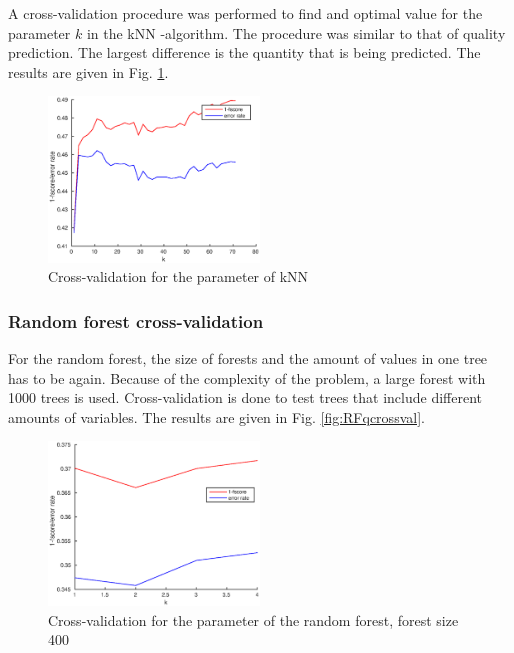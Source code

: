 \documentclass[twoside]{article}
\begin{document}
\begin{multicols}{2}
A cross-validation procedure was performed to find and optimal value for the parameter $k$ in the 
kNN -algorithm. The procedure was similar to that of quality prediction. The largest difference is
the quantity that is being predicted. The results are given in
Fig. \ref{fig:knnqcrossval}.

\begin{figure}[H]
\centering
\includegraphics[width=0.5\textwidth]{knnqcrossval}
\caption{Cross-validation for the parameter of kNN}
\label{fig:knnqcrossval}
\end{figure}

\subsubsection{Random forest cross-validation}

For the random forest, the size of forests and the amount of values in one tree has to be again.
Because of the complexity of the problem, a large forest with 1000 trees is used. Cross-validation
is done to test trees that include different amounts of variables. The results are given in Fig. 
\ref{fig:RFqcrossval}.

\begin{figure}[H]
\centering
\includegraphics[width=0.5\textwidth]{RFqcrossval}
\caption{Cross-validation for the parameter of the random forest, forest size 400}
\label{fig:RFq1000crossval}
\end{figure}


\end{multicols}
\end{document}

